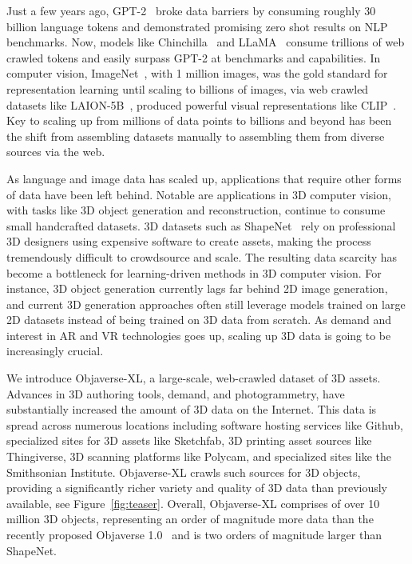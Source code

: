 Just a few years ago, GPT-2~\cite{radford2019language} broke data barriers by consuming roughly 30 billion language tokens and demonstrated promising zero shot results on NLP benchmarks. Now, models like Chinchilla~\cite{hoffmann2022training} and LLaMA~\cite{touvron2023llama} consume trillions of web crawled tokens and easily surpass GPT-2 at benchmarks and capabilities. In computer vision, ImageNet~\cite{deng2009imagenet}, with 1 million images, was the gold standard for representation learning until scaling to billions of images, via web crawled datasets like LAION-5B~\cite{schuhmann2022laion}, produced powerful visual representations like CLIP~\cite{radford2021learning}. Key to scaling up from millions of data points to billions and beyond has been the shift from assembling datasets manually to assembling them from diverse sources via the web.

As language and image data has scaled up, applications that require other forms of data have been left behind. Notable are applications in 3D computer vision, with tasks like 3D object generation and reconstruction, continue to consume small handcrafted datasets. 3D datasets such as ShapeNet~\cite{chang2015shapenet} rely on professional 3D designers using expensive software to create assets, making the process tremendously difficult to crowdsource and scale. The resulting data scarcity has become a bottleneck for learning-driven methods in 3D computer vision. For instance, 3D object generation currently lags far behind 2D image generation, and current 3D generation approaches often still leverage models trained on large 2D datasets instead of being trained on 3D data from scratch. As demand and interest in AR and VR technologies goes up, scaling up 3D data is going to be increasingly crucial.

We introduce Objaverse-XL, a large-scale, web-crawled dataset of 3D assets. Advances in 3D authoring tools, demand, and photogrammetry, have substantially increased the amount of 3D data on the Internet. This data is spread across numerous locations including software hosting services like Github, specialized sites for 3D assets like Sketchfab, 3D printing asset sources like Thingiverse, 3D scanning platforms like Polycam, and specialized sites like the Smithsonian Institute. Objaverse-XL crawls such sources for 3D objects, providing a significantly richer variety and quality of 3D data than previously available, see Figure~\ref{fig:teaser}. Overall, Objaverse-XL comprises of over 10 million 3D objects, representing an order of magnitude more data than the recently proposed Objaverse 1.0~\cite{deitke2022objaverse} and is two orders of magnitude larger than ShapeNet.

